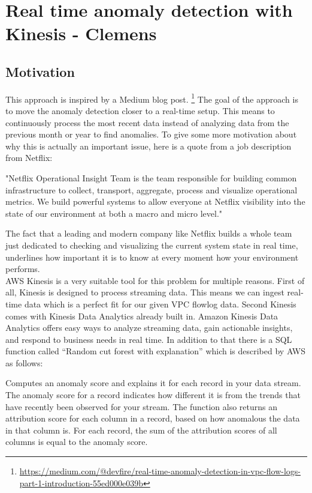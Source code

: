 \section{Real time anomaly detection with Kinesis - Clemens}
\label{sec:real_time_anomaly_detection}
    \subsection{Motivation}
    This approach is inspired by a Medium blog post\cite{MEDIUM}. 
    \footnote{\scriptsize{\url{https://medium.com/@devfire/real-time-anomaly-detection-in-vpc-flow-logs-part-1-introduction-55ed000e039b}}}
    The goal of the approach is to move the anomaly detection closer to a real-time setup. This means to continuously process the most recent data instead of analyzing data from the previous month or year to find anomalies. To give some more motivation about why this is actually an important issue, here is a quote from a job description from Netflix\cite{NETFLIX}:
    \begin{displayquote}
        "Netflix Operational Insight Team is the team responsible for building common infrastructure to collect, transport, aggregate, process and visualize operational metrics. We build powerful systems to allow everyone at Netflix visibility into the state of our environment at both a macro and micro level."
    \end{displayquote}
    The fact that a leading and modern company like Netflix builds a whole team just dedicated to checking and visualizing the current system state in real time, underlines how important it is to know at every moment how your environment performs.\\
    AWS Kinesis is a very suitable tool for this problem for multiple reasons. First of all, Kinesis is designed to process streaming data. This means we can ingest real-time data which is a perfect fit for our given VPC flowlog data. Second Kinesis comes with Kinesis Data Analytics already built in. Amazon Kinesis Data Analytics offers easy ways to analyze streaming data, gain actionable insights, and respond to business needs in real time. In addition to that there is a SQL function called “Random cut forest with explanation” which is described by AWS as follows:
    \begin{displayquote}
        Computes an anomaly score and explains it for each record in your data stream. The anomaly score for a record indicates how different it is from the trends that have recently been observed for your stream. The function also returns an attribution score for each column in a record, based on how anomalous the data in that column is. For each record, the sum of the attribution scores of all columns is equal to the anomaly score. \cite{awsRcf}
    \end{displayquote}

